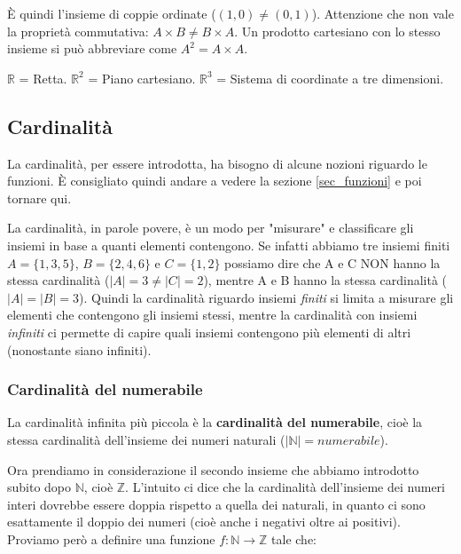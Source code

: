 È quindi l'insieme di coppie ordinate ($(1, 0) \neq (0, 1)$). Attenzione che 
non vale la proprietà commutativa: $A\times B \neq B\times A$. Un prodotto 
cartesiano con lo stesso insieme si può abbreviare come $A^2 = A\times A$.
\bigbreak 

$\mathbb{R}$ = Retta. $\mathbb{R}^2$ = Piano cartesiano. $\mathbb{R}^3$ = 
Sistema di coordinate a tre dimensioni. %

\subsection{Cardinalità}
La cardinalità, per essere introdotta, ha bisogno di alcune nozioni riguardo le 
funzioni. È consigliato quindi andare a vedere la sezione \ref{sec_funzioni} e 
poi tornare qui.\bigbreak



La cardinalità, in parole povere, è un modo per "misurare" e classificare gli 
insiemi in base a quanti elementi contengono. Se infatti abbiamo tre insiemi 
finiti $A=\{1, 3, 5\}$, $B=\{2, 4, 6\}$ e $C=\{1, 2\}$ possiamo dire che A e C 
NON hanno la stessa cardinalità ($|A|=3 \neq |C| = 2$), mentre A e B hanno la 
stessa cardinalità ($|A| = |B| = 3$). Quindi la cardinalità riguardo insiemi 
\textit{finiti} si limita a misurare gli elementi che contengono gli insiemi 
stessi, mentre la cardinalità con insiemi \textit{infiniti} ci permette di 
capire quali insiemi contengono più elementi di altri (nonostante siano 
infiniti).\bigbreak

\subsubsection{Cardinalità del numerabile}
La cardinalità infinita più piccola è la \textbf{cardinalità del numerabile}, 
cioè la stessa cardinalità dell'insieme dei numeri naturali ($|\mathbb{N}| = 
numerabile$).

Ora prendiamo in considerazione il secondo insieme che abbiamo introdotto 
subito dopo $\mathbb{N}$, cioè $\mathbb{Z}.$ L'intuito ci dice che la 
cardinalità dell'insieme dei numeri interi dovrebbe essere doppia rispetto a 
quella dei naturali, in quanto ci sono esattamente il doppio dei numeri (cioè 
anche i negativi oltre ai positivi). Proviamo però a definire una funzione $f: 
\mathbb{N} \to \mathbb{Z}$ tale che:

